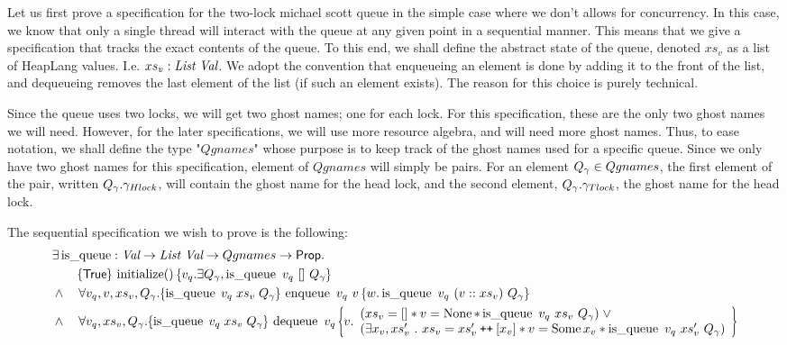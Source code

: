 \documentclass[twoside,11pt,openright]{report}
\newcommand{\initialise}{\operatorname{initialize}}
\newcommand{\enqueue}{\operatorname{enqueue}}
\newcommand{\dequeue}{\operatorname{dequeue}}
\newcommand{\isqueue}{\operatorname{is\_queue}}
\newcommand\catenate{\mathbin{\text{\ttfamily\upshape ++}}}
\begin{document}
Let us first prove a specification for the two-lock michael scott queue in the simple case where we don't allows for concurrency. In this case, we know that only a single thread will interact with the queue at any given point in a sequential manner. This means that we give a specification that tracks the exact contents of the queue. To this end, we shall define the abstract state of the queue, denoted $xs_v$ as a list of HeapLang values. I.e. $xs_v : \textit{List} \ \textit{Val}$. We adopt the convention that enqueueing an element is done by adding it to the front of the list, and dequeueing removes the last element of the list (if such an element exists). The reason for this choice is purely technical.

Since the queue uses two locks, we will get two ghost names; one for each lock. For this specification, these are the only two ghost names we will need. However, for the later specifications, we will use more resource algebra, and will need more ghost names. Thus, to ease notation, we shall define the type "$Qgnames$" whose purpose is to keep track of the ghost names used for a specific queue. Since we only have two ghost names for this specification, element of $Qgnames$ will simply be pairs. For an element $Q_\gamma \in Qgnames$, the first element of the pair, written $Q_\gamma.\gamma_{Hlock}$, will contain the ghost name for the head lock, and the second element, $Q_\gamma.\gamma_{Tlock}$, the ghost name for the head lock.

The sequential specification we wish to prove is the following:
\begin{align*}
  &\exists \isqueue : \Val \to \List \ \Val \to Qgnames \to \Prop.\\
  &\quad\quad\hoare{\TRUE}{\initialise \TT}{v_q . \exists Q_\gname, \isqueue\ v_q\ []\ Q_\gname}\\
  &\land\quad\forall v_q, v, xs_v, Q_\gname. \hoare{\isqueue \; v_q \; xs_v \; Q_\gname}{\enqueue\ v_q\ v}{w . \isqueue\ v_q\ (v :: xs_v)\ Q_\gname}\\
  &\land\quad\forall v_q, xs_v, Q_\gname. \hoare{\isqueue \; v_q \; xs_v \; Q_\gname}{\dequeue\ v_q}{v . \begin{array}{l}(xs_v = [] \ast v = \None \ast \isqueue\ v_q\ xs_v\ Q_\gname) \; \lor\\ (\exists x_v, xs_v' \ . \ xs_v = xs_v' \catenate [x_v] \ast v = \Some x_v \ast \isqueue\ v_q\ xs_v'\ Q_\gname) \end{array}}
\end{align*}
\end{document}
